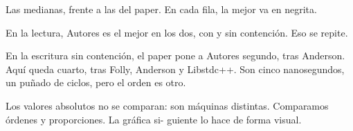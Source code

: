 Las medianas, frente a las del paper. En cada fila, la mejor va en negrita.

En la lectura, Autores es el mejor en los dos, con y sin contención. Eso se repite.

En la escritura sin contención, el paper pone a Autores segundo, tras Anderson. Aquí queda cuarto, tras Folly, Anderson y Libstdc++. Son cinco nanosegundos, un puñado de ciclos, pero el orden es otro.

Los valores absolutos no se comparan: son máquinas distintas. Comparamos órdenes y proporciones. La gráfica si- guiente lo hace de forma visual.
